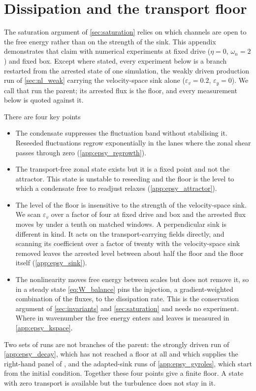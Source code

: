 \documentclass{jpp}
\begin{document}
\section{Dissipation and the transport floor}\label{app:epsy}

The saturation argument of \cref{sec:saturation} relies on which channels are open to the free energy rather than on the strength of the sink. This appendix demonstrates that claim with numerical experiments at fixed drive ($\eta = 0$, $\omega_n = 2$) and fixed box. Except where stated, every experiment below is a branch restarted from the arrested state of one simulation, the weakly driven production run of \cref{sec:nl_weak} carrying the velocity-space sink alone ($\varepsilon_v = 0.2$, $\varepsilon_y = 0$). We call that run the parent; its arrested flux is the floor, and every measurement below is quoted against it.

There are four key points\begin{itemize}
\item The condensate suppresses the fluctuation band without stabilising it. Reseeded fluctuations regrow exponentially in the lanes where the zonal shear passes through zero (\cref{app:epsy_regrowth}).
\item The transport-free zonal state exists but it is a fixed point and not the attractor. This state is unstable to reseeding and the floor is the level to which a condensate free to readjust relaxes (\cref{app:epsy_attractor}).
\item The level of the floor is insensitive to the strength of the velocity-space sink. We scan $\varepsilon_v$ over a factor of four at fixed drive and box and the arrested flux moves by under a tenth on matched windows. A perpendicular sink is different in kind. It acts on the transport-carrying fields directly, and scanning its coefficient over a factor of twenty with the velocity-space sink removed leaves the arrested level between about half the floor and the floor itself (\cref{app:epsy_sink}).
\item The nonlinearity moves free energy between scales but does not remove it, so in a steady state \cref{eq:W_balance} pins the injection, a gradient-weighted combination of the fluxes, to the dissipation rate. This is the conservation argument of \cref{sec:invariants} and \cref{sec:saturation} and needs no experiment. Where in wavenumber the free energy enters and leaves is measured in \cref{app:epsy_kspace}.
\end{itemize}
Two sets of runs are not branches of the parent: the strongly driven run of \cref{app:epsy_decay}, which has not reached a floor at all and which supplies the right-hand panel of , and the adapted-sink runs of \cref{app:epsy_gyroles}, which start from the initial condition. Together these four points give a finite floor. A state with zero transport is available but the turbulence does not stay in it.
\end{document}
